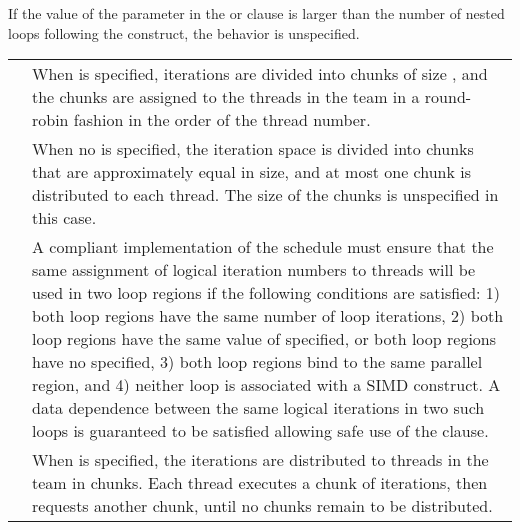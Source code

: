 If the value of the parameter in the  or  
clause is larger than the number of nested loops following the construct, 
the behavior is unspecified.

\vspace{1ex}\renewcommand{\arraystretch}{1.5}
\tablefirsthead{%
\hline\\[-3ex]
}
\tablelasttail{\hline}
\begin{supertabular}{ p{0.8in} p{4.3in} }
 & When  is specified, iterations are divided 
into chunks of size , and the chunks are assigned to the threads in 
the team in a round-robin fashion in the order of the thread number.\\

 & When no  is specified, the iteration space is divided into chunks that 
are approximately equal in size, and at most one chunk is distributed to each 
thread. The size of the chunks is unspecified in this case.\\

 & A compliant implementation of the  schedule must ensure that the 
same assignment of logical iteration numbers to threads will be used in two 
loop regions if the following conditions are satisfied: 1) both loop regions have 
the same number of loop iterations, 2) both loop regions have the same value 
of  specified, or both loop regions have no  specified, 3) 
both loop regions bind to the same parallel region, and 4) neither loop is 
associated with a SIMD construct. A data dependence between the same 
logical iterations in two such loops is guaranteed to be satisfied allowing safe 
use of the  clause.\\

 & When  is specified, the iterations are
distributed to threads in the team in chunks. Each 
thread executes a chunk of iterations, then requests another chunk, until no 
chunks remain to be distributed. \\


\end{supertabular}
